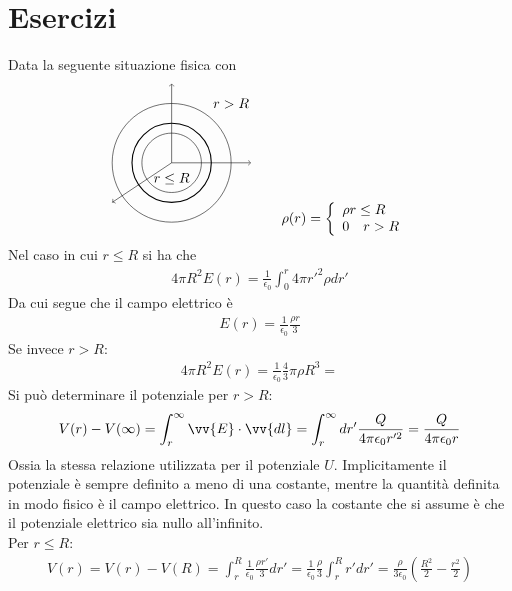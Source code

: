 \documentclass[a4paper, oneside]{article}
\begin{document}
\section{Esercizi}
\begin{example}
    Data la seguente situazione fisica con
    \begin{gather*}
        \begin{tikzpicture}
            \draw[thick](0, 0) circle (1);
            \draw[->](0, 0) -- (2, 0);
            \draw[->](0, 0) -- (0, 2);
            \draw[->](0, 0) -- (-1.5, -1);
            \draw(0, 0) circle (0.75);
            \draw(0, 0) circle (1.5);
            \node at (0, -0.4) {$r \leq R$};
            \node at (1.5, 1.5) {$r > R$};
        \end{tikzpicture} \qquad \rho(r) = \left\{\begin{array}{l}
            \rho r \leq R \\
            0 \quad r > R
        \end{array}\right.
    \end{gather*}
    Nel caso in cui $r \leq R$ si ha che
    \begin{gather*}
        4\pi R^{2}E(r) = \frac{1}{\epsilon_0} \int_{0}^{r} 4\pi r'^{2} \rho dr' 
    \end{gather*}
    Da cui segue che il campo elettrico è 
    \begin{gather*}
        E(r) = \frac{1}{\epsilon_0}\frac{\rho r}{3}
    \end{gather*}
    Se invece $r > R$:
    \begin{gather*}
        4\pi R^{2}E(r) = \frac{1}{\epsilon_0} \frac{4}{3}\pi \rho R^{3} =
    \end{gather*}
    Si può determinare il potenziale per $r > R$:
    \begin{gather*}
        V(r) - V(\infty ) = \int_{r}^{\infty } \vv{E} \cdot \vv{dl} = \int_{r}^{\infty } dr' \frac{Q}{4\pi\epsilon_0r'^{2}} = \frac{Q}{4\pi\epsilon_0 r}   
    \end{gather*}
    Ossia la stessa relazione utilizzata per il potenziale $U$. Implicitamente il 
    potenziale è sempre definito a meno di una costante, mentre la quantità definita in modo
    fisico è il campo elettrico. In questo caso la costante che si assume è che il 
    potenziale elettrico sia nullo all'infinito.  \\
    Per $r \leq R$:
    \begin{gather*}
        V(r) = V(r) - V(R) = \int_{r}^{R} \frac{1}{\epsilon_0} \frac{\rho r'}{3} dr' = \frac{1}{\epsilon_0} \frac{\rho}{3} \int_{r}^{R} r' dr' = \frac{\rho}{3\epsilon_0} \left(\frac{R^{2}}{2} - \frac{r^{2}}{2}\right) 

\end{gather*}
\end{example}
\end{document}
